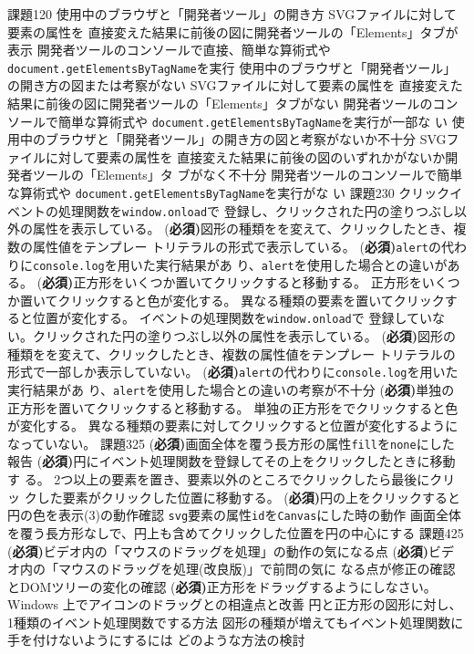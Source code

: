 \documentclass[a4j]{jreport}
\newcommand{\Must}{{(\bfseries 必須)}}
\begin{document}
{{課題1}{20}
{
  {使用中のブラウザと「開発者ツール」の開き方\ResultFI}
  {SVGファイルに対して要素の属性を
  直接変えた結果に前後の図に開発者ツールの「Elements」タブが表示\ResultA}
  {開発者ツールのコンソールで直接、簡単な算術式や
  \texttt{document}\newline\texttt{.getElementsByTagName}を実行\ResultA}
}
{
  {使用中のブラウザと「開発者ツール」の開き方の図または考察がない\ResultFI}
  {SVGファイルに対して要素の属性を
  直接変えた結果に前後の図に開発者ツールの「Elements」タブがない\ResultA}
  {開発者ツールのコンソールで簡単な算術式や
  \texttt{document}\newline\texttt{.getElementsByTagName}を実行が一部な
  い\ResultA}
}
{
  {使用中のブラウザと「開発者ツール」の開き方の図と考察がないか不十分\ResultFI}
  {SVGファイルに対して要素の属性を
  直接変えた結果に前後の図のいずれかがないか開発者ツールの「Elements」タ
  ブがなく不十分\ResultA}
  {開発者ツールのコンソールで簡単な算術式や
  \texttt{document}\newline\texttt{.getElementsByTagName}を実行がな
  い\ResultA}
}
 {課題2}{30}
 {
 {クリックイベントの処理関数を\texttt{window.onload}で
 登録し、クリックされた円の塗りつぶし以外の属性を表示している。\ResultA}
 {\Must 図形の種類をを変えて、クリックしたとき、複数の属性値をテンプレー
 トリテラルの形式で表示している。\ResultA}
 {\Must\texttt{alert}の代わりに\texttt{console.log}を用いた実行結果があ
 り、\texttt{alert}を使用した場合との違いがある。 \ResultFI}
 {\Must 正方形をいくつか置いてクリックすると移動する。\ResultA}
 {正方形をいくつか置いてクリックすると色が変化する。\ResultA}
 {異なる種類の要素を置いてクリックすると位置が変化する。\ResultA}
 }
 {
 {イベントの処理関数を\texttt{window.onload}で
 登録していない。クリックされた円の塗りつぶし以外の属性を表示している。\ResultA}
 {\Must 図形の種類をを変えて、クリックしたとき、複数の属性値をテンプレー
 トリテラルの形式で一部しか表示していない。\ResultA}
 {\Must\texttt{alert}の代わりに\texttt{console.log}を用いた実行結果があ
 り、\texttt{alert}を使用した場合との違いの考察が不十分 \ResultFI}
 {\Must 単独の正方形を置いてクリックすると移動する。\ResultA}
 {単独の正方形をでクリックすると色が変化する。\ResultA}
 {異なる種類の要素に対してクリックすると位置が変化するようになっていない。\ResultA}
 }
 {
 {}
 }
 {課題3}{25}
 {
 {\Must 画面全体を覆う長方形の属性\texttt{fill}を\texttt{none}にした報告
 \ResultEI}
 {\Must 円にイベント処理関数を登録してその上をクリックしたときに移動す
 る。\ResultA}
 {2つ以上の要素を置き、要素以外のところでクリックしたら最後にクリッ
        クした要素がクリックした位置に移動する。\ResultA}
 {\Must 円の上をクリックすると円の色を表示(3)の動作確認\ResultA}
 {\texttt{svg}要素の属性\texttt{id}を\texttt{Canvas}にした時の動作\ResultA}
 {画面全体を覆う長方形なしで、円上も含めてクリックした位置を円の中心にする\ResultA}
 }
 {
 {}
 }
 {
 {}
 }{課題4}{25}
 {
 {\Must ビデオ内の「マウスのドラッグを処理」の動作の気になる点\ResultFI}
{\Must ビデオ内の「マウスのドラッグを処理(改良版)」で前問の気に
なる点が修正の確認とDOMツリーの変化の確認\ResultA}
{\Must 正方形をドラッグするようにしなさい。}
{Windows 上でアイコンのドラッグとの相違点と改善\ResultA}
{円と正方形の図形に対し、1種類のイベント処理関数でする方法
			 図形の種類が増えてもイベント処理関数に手を付けないようにするには
			 どのような方法の検討\ResultA}
 }
 {
 {}
 }
 {
 {}
 }
}

\end{document}

